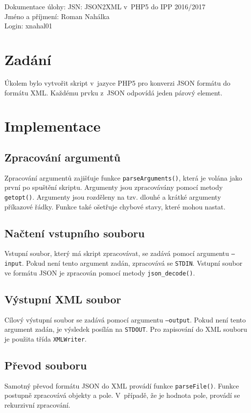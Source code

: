 \documentclass[a4paper, 10pt]{article}
\begin{document}
\noindent
Dokumentace úlohy: JSN: JSON2XML v~PHP5 do IPP 2016/2017\\
Jméno a příjmení: Roman Nahálka\\
Login: xnahal01

\section{Zadání}
Úkolem bylo vytvořit skript v~jazyce PHP5 pro konverzi JSON formátu do formátu XML. Každému prvku z~JSON odpovídá jeden párový element.

\section{Implementace}
\subsection{Zpracování argumentů}
Zpracování argumentů zajišťuje funkce \texttt{parseArguments()}, která je volána jako první po spuštění skriptu. Argumenty jsou zpracovávány pomocí metody \texttt{getopt()}. Argumenty jsou rozděleny na tzv. dlouhé a krátké argumenty příkazové řádky. Funkce také ošetřuje chybové stavy, které mohou nastat.

\subsection{Načtení vstupního souboru}
Vstupní soubor, který má skript zpracovávat, se zadává pomocí argumentu \texttt{--input}. Pokud není tento argument zadán, zpracovává se \texttt{STDIN}. Vstupní soubor ve formátu JSON je zpracován pomocí metody \texttt{json{\_}decode()}.

\subsection{Výstupní XML soubor}
Cílový výstupní soubor se zadává pomocí argumentu \texttt{--output}. Pokud není tento argument zadán, je výsledek posílán na \texttt{STDOUT}. Pro zapisování do XML souboru je použita třída \texttt{XMLWriter}.

\subsection{Převod souboru}
Samotný převod formátu JSON do XML provádí funkce \texttt{parseFile()}. Funkce postupně zpracovává objekty a pole. V~případě, že je hodnota pole, provádí se rekurzivní zpracování.
\end{document}
